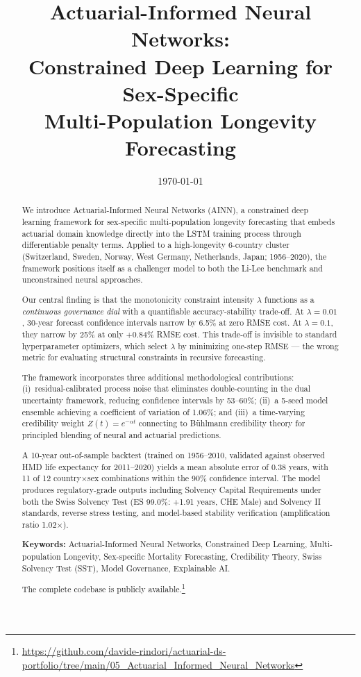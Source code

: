\documentclass[11pt,a4paper]{article}
\title{\textbf{Actuarial-Informed Neural Networks: \\ Constrained Deep Learning for Sex-Specific \\ Multi-Population Longevity Forecasting}}
\date{\today}
\begin{document}
\maketitle

\begin{abstract}
We introduce Actuarial-Informed Neural Networks (AINN), a constrained deep learning framework for sex-specific multi-population longevity forecasting that embeds actuarial domain knowledge directly into the LSTM training process through differentiable penalty terms. Applied to a high-longevity 6-country cluster (Switzerland, Sweden, Norway, West Germany, Netherlands, Japan; 1956--2020), the framework positions itself as a challenger model to both the Li-Lee benchmark and unconstrained neural approaches.

Our central finding is that the monotonicity constraint intensity $\lambda$ functions as a \textit{continuous governance dial} with a quantifiable accuracy-stability trade-off. At $\lambda = 0.01$, 30-year forecast confidence intervals narrow by 6.5\% at zero RMSE cost. At $\lambda = 0.1$, they narrow by 25\% at only +0.84\% RMSE cost. This trade-off is invisible to standard hyperparameter optimizers, which select $\lambda$ by minimizing one-step RMSE --- the wrong metric for evaluating structural constraints in recursive forecasting.

The framework incorporates three additional methodological contributions: (i)~residual-calibrated process noise that eliminates double-counting in the dual uncertainty framework, reducing confidence intervals by 53--60\%; (ii)~a 5-seed model ensemble achieving a coefficient of variation of 1.06\%; and (iii)~a time-varying credibility weight $Z(t) = e^{-\alpha t}$ connecting to B\"uhlmann credibility theory for principled blending of neural and actuarial predictions.

A 10-year out-of-sample backtest (trained on 1956--2010, validated against observed HMD life expectancy for 2011--2020) yields a mean absolute error of 0.38 years, with 11 of 12 country$\times$sex combinations within the 90\% confidence interval. The model produces regulatory-grade outputs including Solvency Capital Requirements under both the Swiss Solvency Test (ES 99.0\%: +1.91 years, CHE Male) and Solvency II standards, reverse stress testing, and model-based stability verification (amplification ratio 1.02$\times$).

\vspace{0.4cm}
\noindent \textbf{Keywords:} Actuarial-Informed Neural Networks, Constrained Deep Learning, Multi-population Longevity, Sex-specific Mortality Forecasting, Credibility Theory, Swiss Solvency Test (SST), Model Governance, Explainable AI.

\vspace{0.2cm}
\noindent The complete codebase is publicly available.\footnote{\url{https://github.com/davide-rindori/actuarial-ds-portfolio/tree/main/05_Actuarial_Informed_Neural_Networks}}
\end{abstract}
\end{document}
